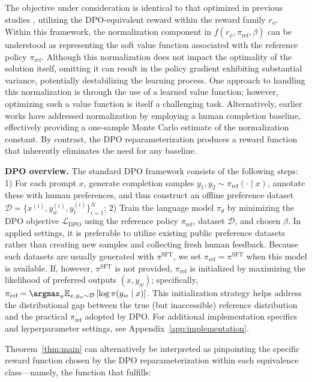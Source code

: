 The objective under consideration is identical to that optimized in previous studies 
\citep{ziegler2020finetuning, stiennon2022learning, bai2022training, ouyang2022training}, utilizing the DPO-equivalent reward within the reward family $r_{\phi}$. Within this framework, the normalization component in $f(r_{\phi}, \pi_\text{ref}, \beta)$ can be understood as representing the soft value function associated with the reference policy $\pi_\text{ref}$. Although this normalization does not impact the optimality of the solution itself, omitting it can result in the policy gradient exhibiting substantial variance, potentially destabilizing the learning process. One approach to handling this normalization is through the use of a learned value function; however, optimizing such a value function is itself a challenging task. Alternatively, earlier works have addressed normalization by employing a human completion baseline, effectively providing a one-sample Monte Carlo estimate of the normalization constant. By contrast, the DPO reparameterization produces a reward function that inherently eliminates the need for any baseline.

\textbf{DPO overview.} The standard DPO framework consists of the following steps: 1) For each prompt $x$, generate completion samples $y_1, y_2 \sim \pi_\text{ref}(\cdot \mid x)$, annotate these with human preferences, and thus construct an offline preference dataset $\mathcal{D} = \{x^{(i)}, y_w^{(i)}, y_l^{(i)}\}_{i=1}^N$; 2) Train the language model $\pi_\theta$ by minimizing the DPO objective $\mathcal{L}_\text{DPO}$ using the reference policy $\pi_\text{ref}$, dataset $\mathcal{D}$, and chosen $\beta$. 
In applied settings, it is preferable to utilize existing public preference datasets rather than creating new samples and collecting fresh human feedback. Because such datasets are usually generated with $\pi^\text{SFT}$, we set $\pi_\text{ref} = \pi^\text{SFT}$ when this model is available. If, however, $\pi^\text{SFT}$ is not provided, $\pi_\text{ref}$ is initialized by maximizing the likelihood of preferred outputs ${(x, y_w)}$; specifically, $\pi_\text{ref} = \argmax_{\pi}\mathbb{E}_{x, y_w \sim \mathcal{D}}\left[\log \pi(y_w \mid x)\right]$. This initialization strategy helps address the distributional gap between the true (but inaccessible) reference distribution and the practical $\pi_\text{ref}$ adopted by DPO. For additional implementation specifics and hyperparameter settings, see Appendix~\ref{app:implementation}.

Theorem~\ref{thm:main} can alternatively be interpreted as pinpointing the specific reward function chosen by the DPO reparameterization within each equivalence class—namely, the function that fulfills:


